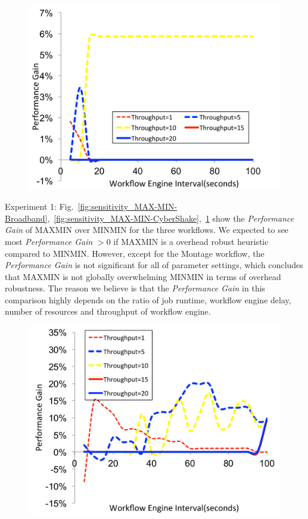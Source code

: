 \begin{figure}[!htb]
\centering
 \includegraphics[width=0.9\linewidth]{figures/sensitivity/MAX-MIN-Montage.pdf}
  \label{fig:sensitivity_MAX-MIN-Montage}
\end{figure}


Experiment 1: Fig.~\ref{fig:sensitivity_MAX-MIN-Broadband},~\ref{fig:sensitivity_MAX-MIN-CyberShake},~\ref{fig:sensitivity_MAX-MIN-Montage} show the  \emph{Performance Gain} of MAXMIN over MINMIN for the three workflows. We expected to see most  \emph{Performance Gain} $>0$ if MAXMIN is a overhead robust heuristic compared to MINMIN. However, except for the Montage workflow, the \emph{Performance Gain} is not significant for all of parameter settings, which concludes that MAXMIN is not globally overwhelming MINMIN in terms of overhead robustness. The reason we believe is that the  \emph{Performance Gain} in this comparison highly depends on the ratio of job runtime, workflow engine delay, number of resources and throughput of workflow engine. 

\begin{figure}[!htb]
\centering
 \includegraphics[width=0.9\linewidth]{figures/sensitivity/DFS-BFS-Broadband.pdf}
  \label{fig:sensitivity_DFS-BFS-Broadband}
\end{figure}

